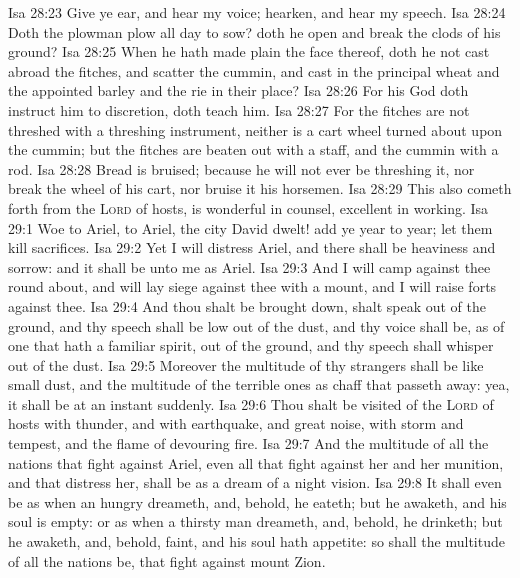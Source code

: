 \vs Isa 28:23 Give ye ear, and hear my voice; hearken, and hear my speech.
\vs Isa 28:24 Doth the plowman plow all day to sow? doth he open and break the clods of his ground?
\vs Isa 28:25 When he hath made plain the face thereof, doth he not cast abroad the fitches, and scatter the cummin, and cast in the principal wheat and the appointed barley and the rie in their place?
\vs Isa 28:26 For his God doth instruct him to discretion,  doth teach him.
\vs Isa 28:27 For the fitches are not threshed with a threshing instrument, neither is a cart wheel turned about upon the cummin; but the fitches are beaten out with a staff, and the cummin with a rod.
\vs Isa 28:28 Bread  is bruised; because he will not ever be threshing it, nor break  the wheel of his cart, nor bruise it  his horsemen.
\vs Isa 28:29 This also cometh forth from the \textsc{Lord} of hosts,  is wonderful in counsel,  excellent in working.
\vs Isa 29:1 Woe to Ariel, to Ariel, the city  David dwelt! add ye year to year; let them kill sacrifices.
\vs Isa 29:2 Yet I will distress Ariel, and there shall be heaviness and sorrow: and it shall be unto me as Ariel.
\vs Isa 29:3 And I will camp against thee round about, and will lay siege against thee with a mount, and I will raise forts against thee.
\vs Isa 29:4 And thou shalt be brought down,  shalt speak out of the ground, and thy speech shall be low out of the dust, and thy voice shall be, as of one that hath a familiar spirit, out of the ground, and thy speech shall whisper out of the dust.
\vs Isa 29:5 Moreover the multitude of thy strangers shall be like small dust, and the multitude of the terrible ones  as chaff that passeth away: yea, it shall be at an instant suddenly.
\vs Isa 29:6 Thou shalt be visited of the \textsc{Lord} of hosts with thunder, and with earthquake, and great noise, with storm and tempest, and the flame of devouring fire.
\vs Isa 29:7 And the multitude of all the nations that fight against Ariel, even all that fight against her and her munition, and that distress her, shall be as a dream of a night vision.
\vs Isa 29:8 It shall even be as when an hungry  dreameth, and, behold, he eateth; but he awaketh, and his soul is empty: or as when a thirsty man dreameth, and, behold, he drinketh; but he awaketh, and, behold,  faint, and his soul hath appetite: so shall the multitude of all the nations be, that fight against mount Zion.
